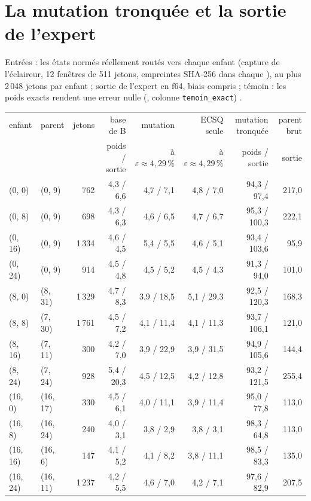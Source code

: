 \section{La mutation tronquée et la sortie de l'expert}\label{t3dup:sec:sortie}

Entrées : les états normés réellement routés vers chaque enfant (capture de l'éclaireur, 12 fenêtres de 511 jetons, empreintes SHA-256 dans chaque ), au plus 2\,048 jetons par enfant ; sortie de l'expert en f64, biais compris ; témoin : les poids exacts rendent une erreur nulle (, colonne \texttt{temoin\_exact}) \mes.

\begin{table}[tbp]
\centering\footnotesize
\begin{tabular}{l l r r r r r r}
\toprule
enfant & parent & jetons & base de B & mutation & ECSQ seule & mutation tronquée & parent brut \\
& & & poids / sortie & à $\varepsilon \approx 4{,}29\,\%$ & à $\varepsilon \approx 4{,}29\,\%$ & poids / sortie & sortie \\
\midrule
(0, 0) & (0, 9) & 762 & 4,3 / 6,6 & 4,7 / 7,1 & 4,8 / 7,0 & 94,3 / 97,4 & 217,0 \\
(0, 8) & (0, 9) & 698 & 4,3 / 6,3 & 4,6 / 6,5 & 4,7 / 6,7 & 95,3 / 100,3 & 222,1 \\
(0, 16) & (0, 9) & 1\,334 & 4,6 / 4,5 & 5,4 / 5,5 & 4,6 / 5,1 & 93,4 / 103,6 & 95,9 \\
(0, 24) & (0, 9) & 914 & 4,5 / 4,8 & 4,5 / 5,2 & 4,5 / 4,3 & 91,3 / 94,0 & 101,0 \\
(8, 0) & (8, 31) & 1\,329 & 4,7 / 8,3 & 3,9 / 18,5 & 5,1 / 29,3 & 92,5 / 120,3 & 168,3 \\
(8, 8) & (7, 30) & 1\,761 & 4,5 / 7,2 & 4,1 / 11,4 & 4,1 / 11,3 & 93,7 / 106,1 & 121,0 \\
(8, 16) & (7, 11) & 300 & 4,2 / 7,0 & 3,9 / 22,9 & 3,9 / 31,5 & 94,9 / 105,6 & 144,4 \\
(8, 24) & (7, 24) & 928 & 5,4 / 20,3 & 4,5 / 12,5 & 4,2 / 12,8 & 93,2 / 121,5 & 255,4 \\
(16, 0) & (16, 17) & 330 & 4,5 / 6,1 & 4,0 / 11,1 & 3,9 / 11,4 & 95,0 / 77,8 & 113,0 \\
(16, 8) & (16, 24) & 240 & 4,0 / 3,1 & 3,8 / 2,9 & 3,8 / 3,1 & 98,3 / 64,8 & 113,0 \\
(16, 16) & (16, 6) & 147 & 4,1 / 5,2 & 4,1 / 8,2 & 3,8 / 11,1 & 98,5 / 83,3 & 135,0 \\
(16, 24) & (16, 11) & 1\,237 & 4,2 / 5,5 & 4,6 / 7,0 & 4,2 / 7,1 & 97,6 / 82,9 & 207,5 \\

\end{tabular}
\end{table}
